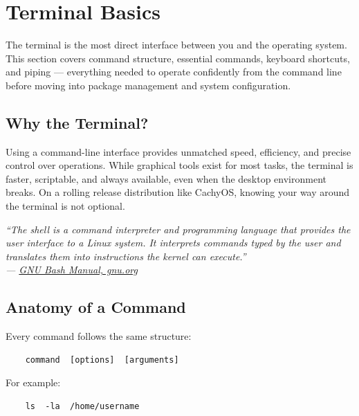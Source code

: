 \documentclass{article}
\begin{document}
\section{Terminal Basics}

The terminal is the most direct interface between you and the operating system. This
section covers command structure, essential commands, keyboard shortcuts, and piping
--- everything needed to operate confidently from the command line before moving into
package management and system configuration.

\subsection{Why the Terminal?}

Using a command-line interface provides unmatched speed, efficiency, and precise control over operations. While graphical tools exist for most tasks, the terminal is faster, scriptable, and always
available, even when the desktop environment breaks. On a rolling release distribution like CachyOS, knowing your way around the terminal is not optional.

\begin{mdframed}[linewidth=1.5pt, linecolor=black!50, topline=true, bottomline=true,
	leftline=false, rightline=false, backgroundcolor=black!3]
	\small\itshape
	``The shell is a command interpreter and programming language that provides the
	user interface to a Linux system. It interprets commands typed by the user
	and translates them into instructions the kernel can execute.''\\[4pt]
	\normalfont\small ---
	\href{https://www.gnu.org/software/bash/manual/bash.html}{GNU Bash Manual,
		gnu.org}
\end{mdframed}

\subsection{Anatomy of a Command}

Every command follows the same structure:

\begin{verbatim}
	command  [options]  [arguments]
\end{verbatim}

For example:

\begin{verbatim}
	ls  -la  /home/username
\end{verbatim}
\end{document}
